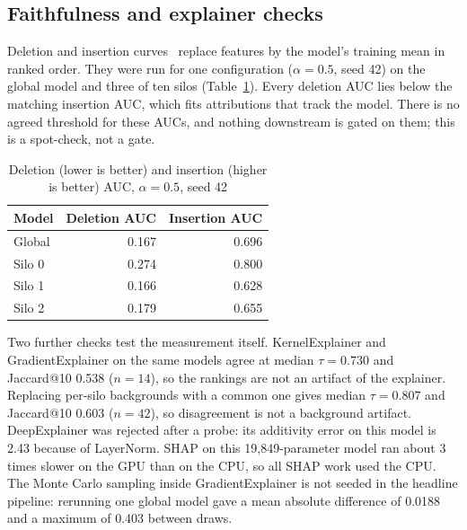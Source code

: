 \subsection{Faithfulness and explainer checks}
Deletion and insertion curves~\cite{petsiuk2018} replace features by the model's
training mean in ranked order. They were run for one configuration ($\alpha=0.5$, seed %
42) on the global model and three of ten silos (Table~\ref{tab:faith}). Every deletion %
AUC lies below the matching insertion AUC, which fits attributions that track the
model. There is no agreed threshold for these AUCs, and nothing downstream is gated on
them; this is a spot-check, not a gate.

\begin{table}[h]
\centering
\caption{Deletion (lower is better) and insertion (higher is better) AUC, $\alpha=0.5$, seed 42} %
\label{tab:faith}
\footnotesize
\begin{tabular}{@{}lrr@{}}
\toprule
Model & Deletion AUC & Insertion AUC\\
\midrule
Global & 0.167 & 0.696\\ %
Silo 0 & 0.274 & 0.800\\ %
Silo 1 & 0.166 & 0.628\\ %
Silo 2 & 0.179 & 0.655\\ %
\bottomrule
\end{tabular}
\end{table}

Two further checks test the measurement itself. KernelExplainer and GradientExplainer
on the same models agree at median $\tau=0.730$ and Jaccard@10 0.538 ($n=14$), so the %
rankings are not an artifact of the explainer. Replacing per-silo backgrounds with a
common one gives median $\tau=0.807$ and Jaccard@10 0.603 ($n=42$), so disagreement is %
not a background artifact. DeepExplainer was rejected after a probe: its additivity error
on this model is 2.43 because of LayerNorm. SHAP on this 19,849-parameter model ran %
about 3 times slower on the GPU than on the CPU, so all SHAP work used the CPU. The %
Monte Carlo sampling inside GradientExplainer is not seeded in the headline pipeline:
rerunning one global model gave a mean absolute difference of 0.0188 and a maximum of %
0.403 between draws. %

